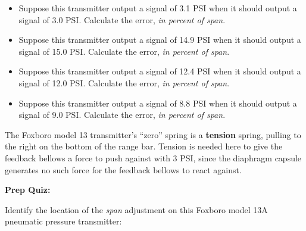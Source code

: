 \begin{itemize}
\item{} Suppose this transmitter output a signal of 3.1 PSI when it should output a signal of 3.0 PSI.  Calculate the error, {\it in percent of span}.
\item{} Suppose this transmitter output a signal of 14.9 PSI when it should output a signal of 15.0 PSI.  Calculate the error, {\it in percent of span}.
\item{} Suppose this transmitter output a signal of 12.4 PSI when it should output a signal of 12.0 PSI.  Calculate the error, {\it in percent of span}.
\item{} Suppose this transmitter output a signal of 8.8 PSI when it should output a signal of 9.0 PSI.  Calculate the error, {\it in percent of span}.
\end{itemize}













The Foxboro model 13 transmitter's ``zero'' spring is a {\bf tension} spring, pulling to the right on the bottom of the range bar.  Tension is needed here to give the feedback bellows a force to push against with 3 PSI, since the diaphragm capsule generates no such force for the feedback bellows to react against.






\vfil \eject

\noindent
{\bf Prep Quiz:}

Identify the location of the {\it span} adjustment on this Foxboro model 13A pneumatic pressure transmitter:

